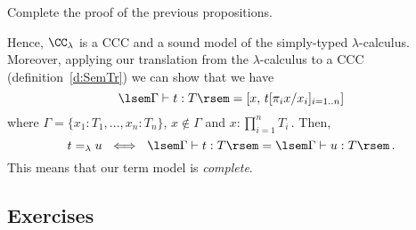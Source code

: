 \documentclass[12pt]{article}
\begin{document}
\begin{myexercise}
Complete the proof of the previous propositions.
\end{myexercise}
%
%
Hence, $\CC_\lambda$ is a CCC and a sound model of the simply-typed $\lambda$-calculus. Moreover, applying our translation from the $\lambda$-calculus to a CCC (definition~\ref{d:SemTr}) we can show that we have
\[ \lsem\Gamma\vdash t:T\rsem = [x,\, t[\pi_ix/x_i]_{i=1..n}] \]
where $\Gamma=\{x_1:T_1,...,x_n:T_n\}$, $x\notin\Gamma$ and $x:\prod_{i=1}^n T_i$\,. Then,
\[ t=_\lambda u \ \iff \ \lsem\Gamma\vdash t:T\rsem = \lsem\Gamma\vdash u:T\rsem\,.  \]
This means that our term model is \emph{complete}.

\subsection{Exercises}\label{ex:CH}
\end{document}
